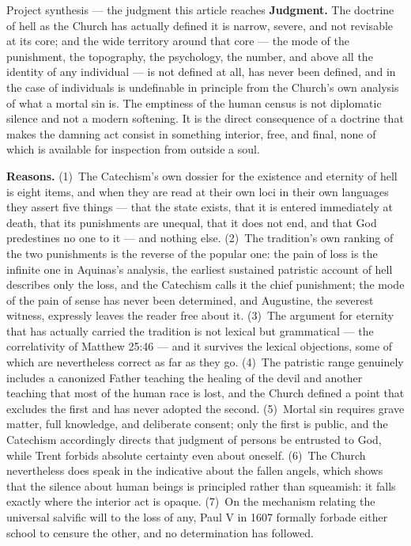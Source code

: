 \begin{studybox}{Project synthesis --- the judgment this article reaches}
\setlength{\parskip}{0.5em}
\textbf{Judgment.} The doctrine of hell as the Church has actually defined it is narrow, severe, and not revisable at its core; and the wide territory around that core --- the mode of the punishment, the topography, the psychology, the number, and above all the identity of any individual --- is not defined at all, has never been defined, and in the case of individuals is undefinable in principle from the Church's own analysis of what a mortal sin is. The emptiness of the human census is not diplomatic silence and not a modern softening. It is the direct consequence of a doctrine that makes the damning act consist in something interior, free, and final, none of which is available for inspection from outside a soul.

\textbf{Reasons.} (1)~The Catechism's own dossier for the existence and eternity of hell is eight items, and when they are read at their own loci in their own languages they assert five things --- that the state exists, that it is entered immediately at death, that its punishments are unequal, that it does not end, and that God predestines no one to it --- and nothing else. (2)~The tradition's own ranking of the two punishments is the reverse of the popular one: the pain of loss is the infinite one in Aquinas's analysis, the earliest sustained patristic account of hell describes only the loss, and the Catechism calls it the chief punishment; the mode of the pain of sense has never been determined, and Augustine, the severest witness, expressly leaves the reader free about it. (3)~The argument for eternity that has actually carried the tradition is not lexical but grammatical --- the correlativity of Matthew 25:46 --- and it survives the lexical objections, some of which are nevertheless correct as far as they go. (4)~The patristic range genuinely includes a canonized Father teaching the healing of the devil and another teaching that most of the human race is lost, and the Church defined a point that excludes the first and has never adopted the second. (5)~Mortal sin requires grave matter, full knowledge, and deliberate consent; only the first is public, and the Catechism accordingly directs that judgment of persons be entrusted to God, while Trent forbids absolute certainty even about oneself. (6)~The Church nevertheless does speak in the indicative about the fallen angels, which shows that the silence about human beings is principled rather than squeamish: it falls exactly where the interior act is opaque. (7)~On the mechanism relating the universal salvific will to the loss of any, Paul V in 1607 formally forbade either school to censure the other, and no determination has followed.


\end{studybox}
